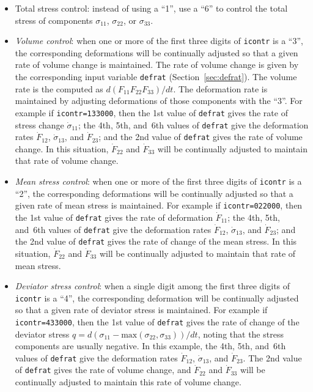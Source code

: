 \documentclass[letterpaper,11pt]{article}
\begin{document}
\begin{itemize}
\item
Total stress control: instead of using a ``1'', use a ``6'' to
control the total stress of components
$\sigma_{11}$, $\sigma_{22}$, or $\sigma_{33}$.

\item
\emph{Volume control}: when one or more of the first three digits
of \texttt{icontr} is a ``3'', the corresponding deformations will be
continually adjusted so that a given rate of volume change is maintained.
The rate of volume change is given by the corresponding input variable
\texttt{defrat} (Section~\ref{sec:defrat}). 
The volume rate is the computed as $d(F_{11} F_{22} F_{33})/dt$.
The deformation rate is maintained by adjusting deformations of those
components with the ``3''.
For example if \texttt{icontr=133000}, then
the 1st value of \texttt{defrat} gives the rate of stress change
$\dot{\sigma}_{11}$; the 4th, 5th, and~6th values
of \texttt{defrat} give the deformation rates
$\dot{F}_{12}$, $\dot{\sigma}_{13}$, and $\dot{F}_{23}$;
and the 2nd value of \texttt{defrat} gives the rate of volume change.
In this situation, $\dot{F}_{22}$ and $\dot{F}_{33}$
will be continually adjusted to maintain that rate of volume change.
\item
\emph{Mean stress control}:
when one or more of the first three digits
of \texttt{icontr} is a ``2'', the corresponding deformations will be
continually adjusted so that a given rate of mean stress is maintained.
For example if \texttt{icontr=022000}, then
the 1st value of \texttt{defrat} gives the rate of deformation
$\dot{F}_{11}$; the 4th, 5th, and~6th values
of \texttt{defrat} give the deformation rates
$\dot{F}_{12}$, $\dot{\sigma}_{13}$, and $\dot{F}_{23}$;
and the 2nd value of \texttt{defrat} gives the rate of change
of the mean stress.
In this situation, $\dot{F}_{22}$ and $\dot{F}_{33}$
will be continually adjusted to maintain that rate of mean stress.
\item
\emph{Deviator stress control}:
when a single digit among the first three digits
of \texttt{icontr} is a ``4'', the corresponding deformation
will be continually adjusted so that a given rate of deviator stress
is maintained.
For example if \texttt{icontr=433000}, then
the 1st value of \texttt{defrat} gives the rate of change of
the deviator stress 
$q = d(\sigma_{11} - \text{max}(\sigma_{22},\sigma_{33}))/dt$,
noting that the stress components are usually negative.
In this example,
the 4th, 5th, and~6th values
of \texttt{defrat} give the deformation rates
$\dot{F}_{12}$, $\dot{\sigma}_{13}$, and $\dot{F}_{23}$.
The 2nd value of \texttt{defrat} gives the rate of volume change,
and $\dot{F}_{22}$ and $\dot{F}_{33}$
will be continually adjusted to maintain this rate of volume change.
\end{itemize}
%
\end{document}
